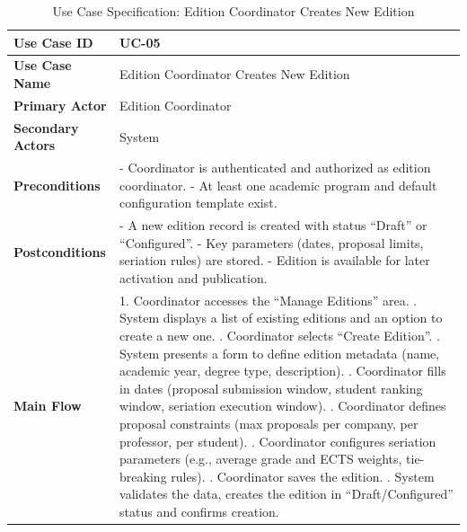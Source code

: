 \newpage
\renewcommand{\arraystretch}{1.5} 
\begin{xltabular}{\textwidth}{|l|X|}
    \caption{Use Case Specification: Edition Coordinator Creates New Edition} \label{tab:UC-05} \\
    
    \hline
    \textbf{Use Case ID} & UC-05 \\ \hline
    \textbf{Use Case Name} & Edition Coordinator Creates New Edition \\ \hline
    \textbf{Primary Actor} & Edition Coordinator \\ \hline
    \textbf{Secondary Actors} & System \\ \hline
    \textbf{Preconditions} &
        - Coordinator is authenticated and authorized as edition coordinator. \newline
        - At least one academic program and default configuration template exist.
        \\ \hline
    \textbf{Postconditions} &
        - A new edition record is created with status “Draft” or “Configured”. \newline
        - Key parameters (dates, proposal limits, seriation rules) are stored. \newline
        - Edition is available for later activation and publication.
        \\ \hline
    \textbf{Main Flow} &
        1. Coordinator accesses the “Manage Editions” area. . System displays a list of existing editions and an option to create a new one. . Coordinator selects “Create Edition”. . System presents a form to define edition metadata (name, academic year, degree type, description). . Coordinator fills in dates (proposal submission window, student ranking window, seriation execution window). . Coordinator defines proposal constraints (max proposals per company, per professor, per student). . Coordinator configures seriation parameters (e.g., average grade and ECTS weights, tie-breaking rules). . Coordinator saves the edition. . System validates the data, creates the edition in “Draft/Configured” status and confirms creation. \\ \hline

\end{xltabular}

